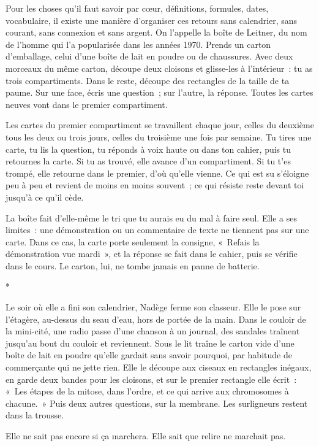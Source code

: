 \documentclass[10.5pt,twoside,openright]{book}
\newcommand{\asterisme}{\par\vspace{0.7em}\centerline{\color{gris}*\quad*\quad*}\vspace{0.7em}\par\noindent}
\begin{document}
Pour les choses qu’il faut savoir par cœur, définitions, formules, dates, vocabulaire, il existe une manière d’organiser ces retours sans calendrier, sans courant, sans connexion et sans argent. On l’appelle la boîte de Leitner, du nom de l’homme qui l’a popularisée dans les années 1970. Prends un carton d’emballage, celui d’une boîte de lait en poudre ou de chaussures. Avec deux morceaux du même carton, découpe deux cloisons et glisse-les à l’intérieur : tu as trois compartiments. Dans le reste, découpe des rectangles de la taille de ta paume. Sur une face, écris une question ; sur l’autre, la réponse. Toutes les cartes neuves vont dans le premier compartiment.

Les cartes du premier compartiment se travaillent chaque jour, celles du deuxième tous les deux ou trois jours, celles du troisième une fois par semaine. Tu tires une carte, tu lis la question, tu réponds à voix haute ou dans ton cahier, puis tu retournes la carte. Si tu as trouvé, elle avance d’un compartiment. Si tu t’es trompé, elle retourne dans le premier, d’où qu’elle vienne. Ce qui est su s’éloigne peu à peu et revient de moins en moins souvent ; ce qui résiste reste devant toi jusqu’à ce qu’il cède.

La boîte fait d’elle-même le tri que tu aurais eu du mal à faire seul. Elle a ses limites : une démonstration ou un commentaire de texte ne tiennent pas sur une carte. Dans ce cas, la carte porte seulement la consigne, « Refais la démonstration vue mardi », et la réponse se fait dans le cahier, puis se vérifie dans le cours. Le carton, lui, ne tombe jamais en panne de batterie.

\asterisme

Le soir où elle a fini son calendrier, Nadège ferme son classeur. Elle le pose sur l’étagère, au-dessus du seau d’eau, hors de portée de la main. Dans le couloir de la mini-cité, une radio passe d’une chanson à un journal, des sandales traînent jusqu’au bout du couloir et reviennent. Sous le lit traîne le carton vide d’une boîte de lait en poudre qu’elle gardait sans savoir pourquoi, par habitude de commerçante qui ne jette rien. Elle le découpe aux ciseaux en rectangles inégaux, en garde deux bandes pour les cloisons, et sur le premier rectangle elle écrit : « Les étapes de la mitose, dans l’ordre, et ce qui arrive aux chromosomes à chacune. » Puis deux autres questions, sur la membrane. Les surligneurs restent dans la trousse.

Elle ne sait pas encore si ça marchera. Elle sait que relire ne marchait pas.
\end{document}
